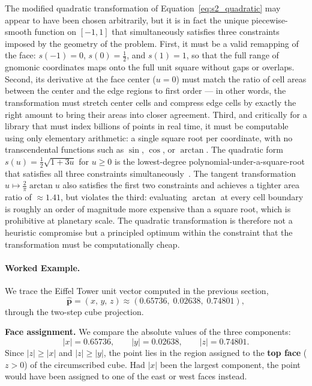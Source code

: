\documentclass{book}
\begin{document}
\noindent The modified quadratic transformation of
Equation~\eqref{eq:s2_quadratic} may appear to have been chosen
arbitrarily, but it is in fact the unique piecewise-smooth function
on $[-1, 1]$ that simultaneously satisfies three constraints imposed
by the geometry of the problem.  First, it must be a valid remapping
of the face: $s(-1) = 0$, $s(0) = \tfrac{1}{2}$, and $s(1) = 1$,
so that the full range of gnomonic coordinates maps onto the full
unit square without gaps or overlaps.  Second, its derivative at the
face center ($u = 0$) must match the ratio of cell areas between the
center and the edge regions to first order --- in other words, the
transformation must stretch center cells and compress edge cells by
exactly the right amount to bring their areas into closer agreement.
Third, and critically for a library that must index billions of
points in real time, it must be computable using only elementary
arithmetic: a single square root per coordinate, with no
transcendental functions such as $\sin$, $\cos$, or $\arctan$.  The
quadratic form $s(u) = \tfrac{1}{2}\sqrt{1 + 3u}$ for $u \geq 0$ is
the lowest-degree polynomial-under-a-square-root that satisfies all
three constraints simultaneously~\cite{s2geometry}.  The tangent
transformation $u \mapsto \frac{2}{\pi}\arctan u$ also satisfies the
first two constraints and achieves a tighter area ratio of
$\approx 1.41$, but violates the third: evaluating $\arctan$ at
every cell boundary is roughly an order of magnitude more expensive
than a square root, which is prohibitive at planetary scale.  The
quadratic transformation is therefore not a heuristic compromise but
a principled optimum within the constraint that the transformation
must be computationally cheap.

\paragraph{Worked Example.}

We trace the Eiffel Tower unit vector computed in the previous
section,
\[
  \hat{\mathbf{p}} = (x,\, y,\, z)
  \approx (0.65736,\; 0.02638,\; 0.74801),
\]
through the two-step cube projection.

\medskip
\noindent\textbf{Face assignment.}
We compare the absolute values of the three components:
\[
  |x| = 0.65736, \qquad |y| = 0.02638, \qquad |z| = 0.74801.
\]
Since $|z| \geq |x|$ and $|z| \geq |y|$, the point lies in the
region assigned to the \textbf{top face} ($z > 0$) of the
circumscribed cube.  Had $|x|$ been the largest component, the point
would have been assigned to one of the east or west faces instead.
\end{document}
